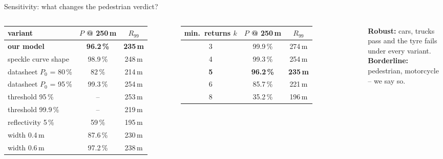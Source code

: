 \documentclass[aspectratio=169,11pt]{beamer}
\newcommand{\fail}[1]{\textcolor{red!70!black}{\textbf{#1}}}
\newcommand{\pass}[1]{\textcolor{green!45!black}{\textbf{#1}}}
\begin{document}
\begin{frame}{Sensitivity: what changes the pedestrian verdict?}
  \footnotesize
  \begin{columns}[t]
    \centering
    \begin{tabular}{lcc}
      \toprule
      variant & $P$ @ 250\,m & $R_{99}$ \\
      \midrule
      \textbf{our model} & \textbf{96.2\,\%} & \textbf{235\,m} \\
      speckle curve shape & 98.9\,\% & 248\,m \\
      datasheet $P_0$ = 80\,\% & 82\,\% & 214\,m \\
      datasheet $P_0$ = 95\,\% & 99.3\,\% & 254\,m \\
      threshold 95\,\% & -- & 253\,m \\
      threshold 99.9\,\% & -- & 219\,m \\
      reflectivity 5\,\% & 59\,\% & 195\,m \\
      width 0.4\,m & 87.6\,\% & 230\,m \\
      width 0.6\,m & 97.2\,\% & 238\,m \\
      \bottomrule
    \end{tabular}
    \centering
    \begin{tabular}{ccc}
      \toprule
      min.\ returns $k$ & $P$ @ 250\,m & $R_{99}$ \\
      \midrule
      3 & 99.9\,\% & 274\,m \\
      4 & 99.3\,\% & 254\,m \\
      \textbf{5} & \textbf{96.2\,\%} & \textbf{235\,m} \\
      6 & 85.7\,\% & 221\,m \\
      8 & 35.2\,\% & 196\,m \\
      \bottomrule
    \end{tabular}\\[1em]
    \raggedright\small
    \pass{Robust:} cars, trucks pass and the tyre fails under every variant.\\[0.3em]
    \fail{Borderline:} pedestrian, motorcycle -- we say so.
  \end{columns}
\end{frame}
\end{document}
